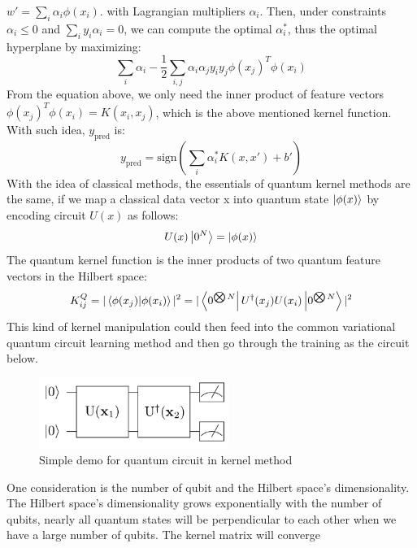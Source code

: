 \documentclass{article}
\begin{document}
$w' = \sum_i \alpha_i \phi(x_i)$. with Lagrangian multipliers 
$\alpha_i$. Then, under constraints $\alpha_i \leq 0 $ and 
$\sum_i y_i \alpha_i = 0$, we can compute the optimal 
$\alpha_i^{*}$, thus the optimal hyperplane by maximizing: 
\begin{equation}
  \sum_i \alpha_i - \frac{1}{2} \sum_{i, j} \alpha_i \alpha_j y_i y_j 
  \phi(x_j)^T \phi(x_i)
\end{equation}
From the equation above, we only need the inner product of feature 
vectors $\phi(x_j)^T \phi(x_i) = K(x_i, x_j)$, which is the above 
mentioned kernel function. With such idea, $y_{\text{pred}}$ is: 
\begin{equation}
  y_{ \text{pred}} = \text{sign} ( \sum_i \alpha_i^* K(x,x') +b')
\end{equation}
With the idea of classical methods, the essentials of 
quantum kernel methods are the same, if we map a 
classical data vector x into quantum state $\ket{\phi(x)}$
by encoding circuit $U(x)$ as follows:
\begin{equation}
  U(x) \ket{0^{N}} = \ket{\phi(x)}
\end{equation}
The quantum kernel function is the inner products of 
two quantum feature vectors in the Hilbert space:
\begin{equation}
  K^Q_{ij} = |\bra{\phi(x_j)} \ket{\phi(x_i) }|^2 = |\bra{0^{\bigotimes N}} U^{\dagger}(x_j) U(x_i) \ket{ 0^{\bigotimes N }} |^2
\end{equation}
This kind of kernel manipulation could then feed into 
the common variational quantum circuit learning method 
and then go through the training as the circuit below. 
\begin{figure}[h]
  \begin{center}
    \includegraphics[width=0.55\textwidth]{kernel.png}    
  \end{center}
  \caption{Simple demo for quantum circuit in kernel method}
\end{figure}
One consideration is the number of 
qubit and the Hilbert space's dimensionality. 
The Hilbert space's dimensionality grows exponentially 
with the number of qubits, nearly all quantum states
will be perpendicular to each other when we have a large 
number of qubits. The kernel matrix will converge 
\end{document}
